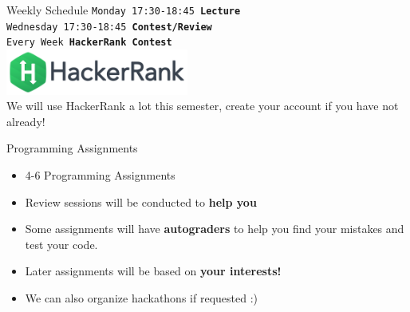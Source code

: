 		\begin{frame}{Weekly Schedule}
			\LARGE
			\texttt{Monday 17:30-18:45 \textbf{Lecture}}\\
			\texttt{Wednesday 17:30-18:45 \textbf{Contest/Review}}\\
			\texttt{Every Week \textbf{HackerRank Contest}}\\
			\vspace{4mm}
			\centering
			\includegraphics[width=6cm]{images/hackerrank.png}\\
			We will use HackerRank a lot this semester, create your account if you have not already!
		\end{frame}

		\begin{frame}{Programming Assignments}
			\begin{itemize}
				\LARGE
				\item 4-6 Programming Assignments
				\item Review sessions will be conducted to \textbf{help you}
				\item Some assignments will have \textbf{autograders} to help you find your mistakes and test your code.
				\item Later assignments will be based on \textbf{your interests!}
				\item We can also organize hackathons if requested :)
			\end{itemize}
			\LARGE
			
		\end{frame}

